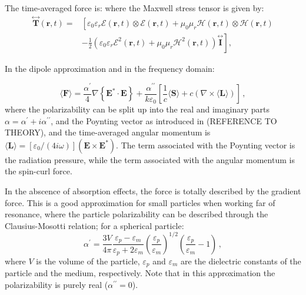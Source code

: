 The time-averaged force is:
where the Maxwell stress tensor is given by:
\begin{equation}
    \begin{aligned}
    \stackrel{\leftrightarrow}{\mathbf{T}}(\mathbf{r}, t)= & {\left[\varepsilon_0 \varepsilon_r \mathcal{E}(\mathbf{r}, t) \otimes \mathcal{E}(\mathbf{r}, t)+\mu_0 \mu_r \mathcal{H}(\mathbf{r}, t) \otimes \mathcal{H}(\mathbf{r}, t)\right.} \\
    & \left.-\frac{1}{2}\left(\varepsilon_0 \varepsilon_r \mathcal{E}^2(\mathbf{r}, t)+\mu_0 \mu_r \mathcal{H}^2(\mathbf{r}, t)\right) \stackrel{\leftrightarrow}{\mathbf{I}}\right],
    \end{aligned}
\end{equation}

In the dipole approximation and in the frequency domain:

\begin{equation}
    \langle\mathbf{F}\rangle=\frac{\alpha^{\prime}}{4} \nabla\left\{\mathbf{E}^* \cdot \mathbf{E}\right\}
    +\frac{\alpha^{\prime \prime}}{k \varepsilon_0} \left[\frac{1}{c}\langle \mathbf{S} \rangle + c \left( \nabla \times \langle \mathbf{L} \rangle \right)\right]\,,
\end{equation}
where the polarizability can be split up into the real and imaginary parts 
$\alpha=\alpha^\prime + i \alpha^{\prime \prime}$, and the Poynting vector as introduced in 
(REFERENCE TO THEORY), and the time-averaged angular momentum is 
$\langle \mathbf{L} \rangle = [\varepsilon_0/(4 i \omega)](\mathbf{E} \times \mathbf{E}^*)$. 
The term associated with the Poynting vector is the radiation pressure, while the term associated 
with the angular momentum is the spin-curl force.

In the abscence of absorption effects, the force is totally described 
by the gradient force. This is a good approximation for small particles
when working far of resonance, where the particle polarizability can be 
described through the Clausius-Mosotti relation; for a spherical particle:
\begin{equation}
    \alpha^{\prime}=\frac{3 V}{4 \pi} \frac{\varepsilon_p-\varepsilon_m}{\varepsilon_p+2 \varepsilon_m} \left(\frac{\varepsilon_p}{\varepsilon_m}\right)^{1 / 2} \left(\frac{\varepsilon_p}{\varepsilon_m}-1\right)\,,
\end{equation}
where $V$ is the volume of the particle, $\varepsilon_p$ and $\varepsilon_m$ are the
dielectric constants of the particle and the medium, respectively. Note that in this 
approximation the polarizability is purely real ($\alpha^{\prime \prime} = 0$).

